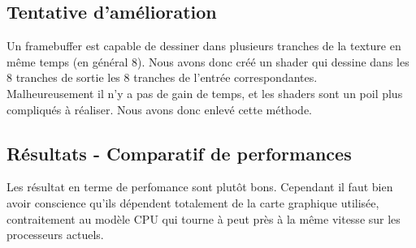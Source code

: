 \documentclass[a4paper,10pt]{article}
\begin{document}
 
\subsection{Tentative d'amélioration}
Un framebuffer est capable de dessiner dans plusieurs tranches de la
texture en même temps (en général 8). Nous avons donc créé un shader qui dessine
dans les 8 tranches de sortie les 8 tranches de l'entrée
correspondantes.\\
Malheureusement il n'y a pas de gain de temps, et les shaders sont
un poil plus compliqués à réaliser. Nous avons donc enlevé cette méthode.

\subsection{Résultats - Comparatif de performances}
Les résultat en terme de perfomance sont plutôt bons. Cependant il faut
bien avoir conscience qu'ils dépendent totalement de la carte graphique utilisée,
contraitement au modèle CPU qui tourne à peut près à la même vitesse sur les processeurs
actuels.\\
\end{document}
